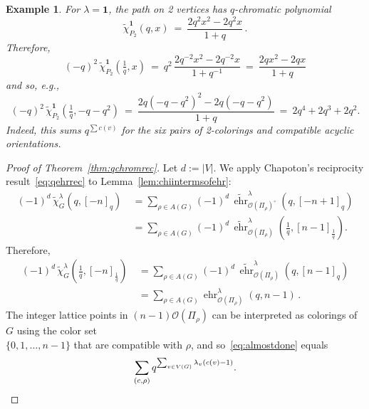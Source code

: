 \documentclass[11pt]{amsart}
\newtheorem{exam}{Example}
\newenvironment{example}{\begin{exam}\sf}{\end{exam}}
\newcommand\ehr{\operatorname{ehr}}
\newcommand\bone{\mathbf{1}}
\begin{document}
\begin{example}
For $\lambda=\bone$, the path on 2 vertices has $q$-chromatic polynomial
\[
\widetilde{\chi}^\bone_{P_2}(q,x) \ = \ \frac{2q^2x^2 - 2q^2x}{1+q} \, .
\]
Therefore,
\[
(-q)^2 \, \widetilde{\chi}^\bone_{P_2}(\tfrac 1q ,x)
 \ = \ q^2\, \frac{2q^{-2}x^2-2q^{-2}x}{1+q^{-1}}
 \ = \ \frac{2qx^2-2qx}{1+q}
\]
and so, e.g.,
\[
(-q)^2 \, \widetilde{\chi}^\bone_{P_2}(\tfrac 1q,-q-q^2)
\ = \ \frac{2q(-q-q^2)^2-2q(-q-q^2)}{1+q}
\ = \ 2q^4+2q^3+2q^2.
\]
Indeed, this sums $q^{\sum c(v)}$ for the six pairs of 2-colorings and compatible acyclic orientations.
\end{example}

\vspace{0.25cm} 

\begin{proof}[Proof of Theorem~\ref{thm:qchromrec}]
Let $d := |V|$.
We apply Chapoton's reciprocity result~\eqref{eq:qehrrec} to Lemma~\ref{lem:chiintermsofehr}:
\begin{align*}
(-1)^d \, \widetilde{\chi}^\lambda_G (q,[-n]_q)
\ &=\sum_{\rho\in A(G)}(-1)^d \, \widetilde{\ehr}^\lambda_{\mathcal{O}(\Pi_\rho)^\circ}(q,[-n+1]_q)\\
&=\sum_{\rho\in A(G)}(-1)^d \, \widetilde{\ehr}^\lambda_{\mathcal{O}(\Pi_\rho)} \left(\tfrac
1q,[n-1]_{\frac 1q}\right) .
\end{align*}
Therefore,
\begin{align}
(-1)^d \, \widetilde{\chi}^\lambda_G \left( \tfrac 1q, [-n]_{ \frac 1q} \right)
\ &=\sum_{\rho\in A(G)}(-1)^d \, \widetilde{\ehr}^\lambda_{\mathcal{O}(\Pi_\rho)}(q,[n-1]_{q}) \nonumber \\
&=\sum_{\rho\in A(G)}\ehr^\lambda_{\mathcal{O}(\Pi_\rho)}(q,n-1) \, . \label{eq:almostdone}
\end{align}
The integer lattice points in $(n-1)\mathcal{O}(\Pi_\rho)$ can be interpreted as colorings of $G$ using the color set\\ 
$\{0,1,\hdots,n-1\}$ that are compatible with $\rho$,
and so~\eqref{eq:almostdone} equals
\[
\sum_{(c,\rho)} q^{\sum_{v\in V(G)} \lambda_v (c(v)-1)}. \qedhere
\]
\end{proof}
\end{document}
